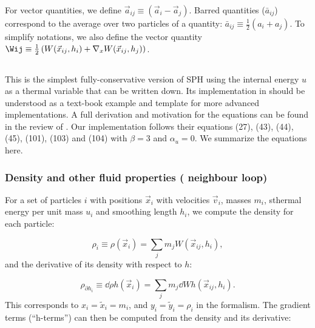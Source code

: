 For vector quantities, we define $\vec{a}_{ij} \equiv (\vec{a}_i -
\vec{a}_j)$. Barred quantities ($\bar a_{ij}$) correspond to the
average over two particles of a quantity: $\bar a_{ij} \equiv
\frac{1}{2}(a_i + a_j)$. To simplify notations, we also define the
vector quantity $\Wij \equiv \frac{1}{2}\left(W(\vec{x}_{ij}, h_i) +
\nabla_x W(\vec{x}_{ij},h_j)\right)$.



\subsection{\MinimalSPH}
\label{sec:sph:minimal}

This is the simplest fully-conservative version of SPH using the
internal energy $u$ as a thermal variable that can be written
down. Its implementation in \swift should be understood as a text-book
example and template for more advanced implementations. A full
derivation and motivation for the equations can be found in the review
of \cite{Price2012}. Our implementation follows their equations (27),
(43), (44), (45), (101), (103) and (104) with $\beta=3$ and
$\alpha_u=0$. We summarize the equations here.

\subsubsection{Density and other fluid properties ( neighbour loop)}

For a set of particles $i$ with positions $\vec{x}_i$ with velocities
$\vec{v}_i$, masses $m_i$, sthermal energy per unit mass $u_i$ and
smoothing length $h_i$, we compute the density for each particle:

\begin{equation}
  \rho_i \equiv \rho(\vec{x}_i) = \sum_j m_j W(\vec{x}_{ij}, h_i),
  \label{eq:sph:minimal:rho}
\end{equation}
and the derivative of its density with respect to $h$:

\begin{equation}
    \label{eq:sph:minimal:rho_dh}
  \rho_{\partial h_i} \equiv \dd{\rho}{h}(\vec{x}_i) = \sum_j m_j
\dd{W}{h}(\vec{x}_{ij}
  , h_i).
\end{equation}
This corresponds to $x_i = \tilde{x}_i = m_i$, and $y_i =\tilde{y}_i = \rho_i$
in the \citet{hopkins2013} formalism.  The gradient terms (``h-terms'') can
then be computed from the density and its derivative:

